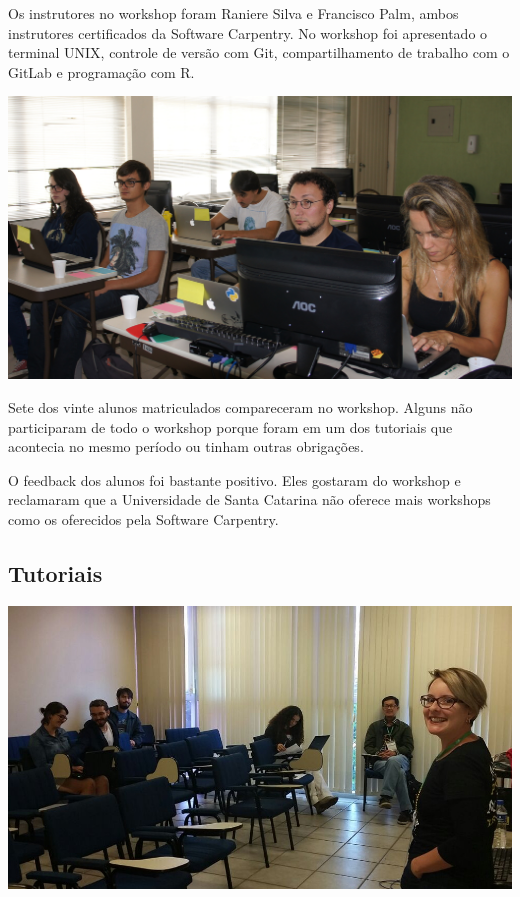 \documentclass[12pt]{article}
\begin{document}
Os instrutores no workshop foram Raniere Silva e Francisco Palm,
ambos instrutores certificados da Software Carpentry.
No workshop foi apresentado o terminal UNIX, controle de versão com Git,
compartilhamento de trabalho com o GitLab e programação com R.

\noindent  %
\includegraphics[width=\textwidth]{swc-students.jpg}

Sete dos vinte alunos matriculados compareceram no workshop.
Alguns não participaram de todo o workshop porque foram em um dos tutoriais que
acontecia no mesmo período ou tinham outras obrigações.

O feedback dos alunos foi bastante positivo. Eles gostaram do workshop
e reclamaram que a Universidade de Santa Catarina não oferece mais workshops
como os oferecidos pela Software Carpentry.

\subsection*{Tutoriais}



\noindent  %
\includegraphics[width=\textwidth]{tutorial-latex.jpg}
\end{document}
